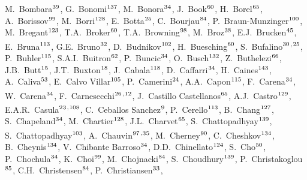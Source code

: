 \begin{flushleft}
M.~Bombara$^\textrm{\scriptsize 39}$,
G.~Bonomi$^\textrm{\scriptsize 137}$,
M.~Bonora$^\textrm{\scriptsize 34}$,
J.~Book$^\textrm{\scriptsize 60}$,
H.~Borel$^\textrm{\scriptsize 65}$,
A.~Borissov$^\textrm{\scriptsize 99}$,
M.~Borri$^\textrm{\scriptsize 128}$,
E.~Botta$^\textrm{\scriptsize 25}$,
C.~Bourjau$^\textrm{\scriptsize 84}$,
P.~Braun-Munzinger$^\textrm{\scriptsize 100}$,
M.~Bregant$^\textrm{\scriptsize 123}$,
T.A.~Broker$^\textrm{\scriptsize 60}$,
T.A.~Browning$^\textrm{\scriptsize 98}$,
M.~Broz$^\textrm{\scriptsize 38}$,
E.J.~Brucken$^\textrm{\scriptsize 45}$,
E.~Bruna$^\textrm{\scriptsize 113}$,
G.E.~Bruno$^\textrm{\scriptsize 32}$,
D.~Budnikov$^\textrm{\scriptsize 102}$,
H.~Buesching$^\textrm{\scriptsize 60}$,
S.~Bufalino$^\textrm{\scriptsize 30}$\textsuperscript{,}$^\textrm{\scriptsize 25}$,
P.~Buhler$^\textrm{\scriptsize 115}$,
S.A.I.~Buitron$^\textrm{\scriptsize 62}$,
P.~Buncic$^\textrm{\scriptsize 34}$,
O.~Busch$^\textrm{\scriptsize 132}$,
Z.~Buthelezi$^\textrm{\scriptsize 66}$,
J.B.~Butt$^\textrm{\scriptsize 15}$,
J.T.~Buxton$^\textrm{\scriptsize 18}$,
J.~Cabala$^\textrm{\scriptsize 118}$,
D.~Caffarri$^\textrm{\scriptsize 34}$,
H.~Caines$^\textrm{\scriptsize 143}$,
A.~Caliva$^\textrm{\scriptsize 53}$,
E.~Calvo Villar$^\textrm{\scriptsize 105}$,
P.~Camerini$^\textrm{\scriptsize 24}$,
A.A.~Capon$^\textrm{\scriptsize 115}$,
F.~Carena$^\textrm{\scriptsize 34}$,
W.~Carena$^\textrm{\scriptsize 34}$,
F.~Carnesecchi$^\textrm{\scriptsize 26}$\textsuperscript{,}$^\textrm{\scriptsize 12}$,
J.~Castillo Castellanos$^\textrm{\scriptsize 65}$,
A.J.~Castro$^\textrm{\scriptsize 129}$,
E.A.R.~Casula$^\textrm{\scriptsize 23}$\textsuperscript{,}$^\textrm{\scriptsize 108}$,
C.~Ceballos Sanchez$^\textrm{\scriptsize 9}$,
P.~Cerello$^\textrm{\scriptsize 113}$,
B.~Chang$^\textrm{\scriptsize 127}$,
S.~Chapeland$^\textrm{\scriptsize 34}$,
M.~Chartier$^\textrm{\scriptsize 128}$,
J.L.~Charvet$^\textrm{\scriptsize 65}$,
S.~Chattopadhyay$^\textrm{\scriptsize 139}$,
S.~Chattopadhyay$^\textrm{\scriptsize 103}$,
A.~Chauvin$^\textrm{\scriptsize 97}$\textsuperscript{,}$^\textrm{\scriptsize 35}$,
M.~Cherney$^\textrm{\scriptsize 90}$,
C.~Cheshkov$^\textrm{\scriptsize 134}$,
B.~Cheynis$^\textrm{\scriptsize 134}$,
V.~Chibante Barroso$^\textrm{\scriptsize 34}$,
D.D.~Chinellato$^\textrm{\scriptsize 124}$,
S.~Cho$^\textrm{\scriptsize 50}$,
P.~Chochula$^\textrm{\scriptsize 34}$,
K.~Choi$^\textrm{\scriptsize 99}$,
M.~Chojnacki$^\textrm{\scriptsize 84}$,
S.~Choudhury$^\textrm{\scriptsize 139}$,
P.~Christakoglou$^\textrm{\scriptsize 85}$,
C.H.~Christensen$^\textrm{\scriptsize 84}$,
P.~Christiansen$^\textrm{\scriptsize 33}$,

\end{flushleft}
